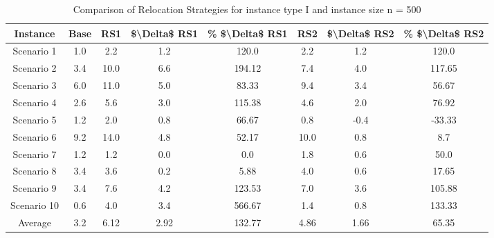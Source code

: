 \begin{table}[H]
\centering
\begin{tabular}{cccccccc}
  \hline
  \textbf{Instance} & \textbf{Base} & \textbf{RS1} & \textbf{\$\textbackslash{}Delta\$  RS1} & \textbf{\% \$\textbackslash{}Delta\$  RS1} & \textbf{RS2} & \textbf{\$\textbackslash{}Delta\$  RS2} & \textbf{\% \$\textbackslash{}Delta\$  RS2} \\\hline
  Scenario 1 & 1.0 & 2.2 & 1.2 & 120.0 & 2.2 & 1.2 & 120.0 \\
  Scenario 2 & 3.4 & 10.0 & 6.6 & 194.12 & 7.4 & 4.0 & 117.65 \\
  Scenario 3 & 6.0 & 11.0 & 5.0 & 83.33 & 9.4 & 3.4 & 56.67 \\
  Scenario 4 & 2.6 & 5.6 & 3.0 & 115.38 & 4.6 & 2.0 & 76.92 \\
  Scenario 5 & 1.2 & 2.0 & 0.8 & 66.67 & 0.8 & -0.4 & -33.33 \\
  Scenario 6 & 9.2 & 14.0 & 4.8 & 52.17 & 10.0 & 0.8 & 8.7 \\
  Scenario 7 & 1.2 & 1.2 & 0.0 & 0.0 & 1.8 & 0.6 & 50.0 \\
  Scenario 8 & 3.4 & 3.6 & 0.2 & 5.88 & 4.0 & 0.6 & 17.65 \\
  Scenario 9 & 3.4 & 7.6 & 4.2 & 123.53 & 7.0 & 3.6 & 105.88 \\
  Scenario 10 & 0.6 & 4.0 & 3.4 & 566.67 & 1.4 & 0.8 & 133.33 \\
  Average & 3.2 & 6.12 & 2.92 & 132.77 & 4.86 & 1.66 & 65.35 \\\hline
\end{tabular}
\caption{Comparison of Relocation Strategies for instance type I and instance size n = 500}
\label{tab:wait:resrelocation-comparison_I_500}
\end{table}
